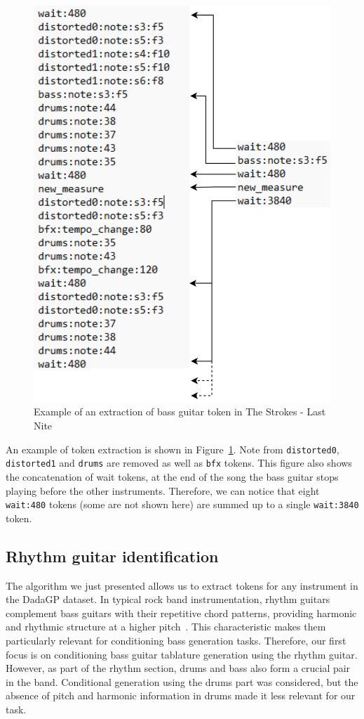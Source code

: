 \begin{figure}[!ht]
    \centering
    \includegraphics[width=.4\linewidth]{../images-figures/token_extraction.png}
    \caption{Example of an extraction of bass guitar token in The Strokes - Last Nite}
    \label{fig:token_extraction}
\end{figure}

An example of token extraction is shown in Figure~\ref{fig:token_extraction}.
Note from \texttt{distorted0}, \texttt{distorted1} and \texttt{drums} are removed as well as \texttt{bfx} tokens.
This figure also shows the concatenation of wait tokens, at the end of the song the bass guitar stops playing before the other instruments.
Therefore, we can notice that eight \texttt{wait:480} tokens (some are not shown here) are summed up to a single \texttt{wait:3840} token.



\subsection{Rhythm guitar identification}

The algorithm we just presented allows us to extract tokens for any instrument in the DadaGP dataset.
In typical rock band instrumentation, rhythm guitars complement bass guitars with their repetitive chord patterns, providing harmonic and rhythmic structure at a higher pitch~\cite{regnier_identification_2021}.
This characteristic makes them particularly relevant for conditioning bass generation tasks. Therefore, our first focus is on conditioning bass guitar tablature generation using the rhythm guitar.
However, as part of the rhythm section, drums and bass also form a crucial pair in the band.
Conditional generation using the drums part was considered, but the absence of pitch and harmonic information in drums made it less relevant for our task.


